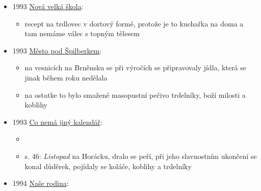 \begin{itemize}
\begin{itemize}
\begin{itemize}
      \begin{itemize}
      \tightlist
      \item
        na malé kónické válečky dřevěné, plechové nebo jak bylo zvykem
        na Hustopečsku na kukuřičné kotrlačky namotáme proužky těsta
      \item
        0.75 l mléka, 10 dkg kvasnic, 6 dkg cuku, 6 dkg másla, 1.5 kg
        polohrubé mouky, 4-5 žloutků, 2 lžíce rumu, citrónová kůra,
        špetka soli
      \item
        obvyklým způsobem zaděláme těsto a na pomoučený vál vyhazujeme z
        vykynutého těsta kousky. Z těch rukou vyválíme váleček 1 cm
        silný a omotáváme na "trdlo". Usmažené pocukrujeme.
      \end{itemize}
    \end{itemize}
  \end{itemize}
\item
  1993
  \href{https://ceskadigitalniknihovna.cz/view/uuid:e294a2f0-8260-11e3-a6e0-005056827e52?page=uuid:32da4ff0-96d7-11e3-ad99-001018b5eb5c&fulltext=trdlovec&source=mzk}{Nová
  velká škola}:

  \begin{itemize}
  \tightlist
  \item
    recept na trdlovec v dortový formě, protože je to kuchařka na doma a
    tam nemáme válec s topným tělesem
  \end{itemize}
\item
  1993
  \href{https://ceskadigitalniknihovna.cz/uuid/uuid:f9f63a60-98ab-11e3-8e84-005056827e51}{Město
  pod Špilberkem}:

  \begin{itemize}
  \tightlist
  \item
    na vesnicích na Brněnsku se při výročích se připravovaly jídla,
    která se jinak během roku nedělala
  \item
    na ostatke to bylo smažené masopustní pečivo trdelníky, boží milosti
    a koblihy
  \end{itemize}
\item
  1993
  \href{https://www.digitalniknihovna.cz/mzk/uuid/uuid:8df9f5c0-73af-11e8-87bd-005056827e52}{Co
  nemá jiný kalendář}:

  \begin{itemize}
  \tightlist
  \item
  \item
    s. 46: \emph{Listopad} na Horácku, dralo se peří, při jeho
    slavnostním ukončení se konal důděrek, pojídaly se koláče, koblihy a
    trdelníky
  \end{itemize}
\item
  1994
  \href{https://ceskadigitalniknihovna.cz/uuid/uuid:7e0705a0-528b-11e6-beb0-001018b5eb5c}{Naše
  rodina}:


\end{itemize}
